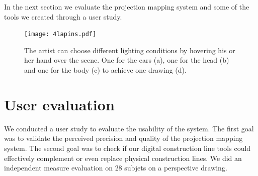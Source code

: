 \documentclass{sigchi}
\begin{document}



In the next section we evaluate the projection mapping system and some
of the tools we created through a user study. 



 
\begin{figure}[!h]
  \centering 
  \texttt{[image: 4lapins.pdf]}
  \caption{The artist can choose different lighting conditions by
    hovering his or her hand over the scene. One
    for the ears (a), one for the head (b) and one for the body
    (c) to achieve one drawing (d).}
  \label{fig:hatching}
\end{figure}
    
\section{User evaluation}

We conducted a user study to evaluate the usability of the system. 
The first goal was to validate the perceived precision and quality of
the projection mapping system. The second goal was to check if our digital
construction line tools could effectively complement or even replace
physical construction lines. We did an independent measure evaluation
on 28 subjets on a perspective drawing. 
\end{document}
